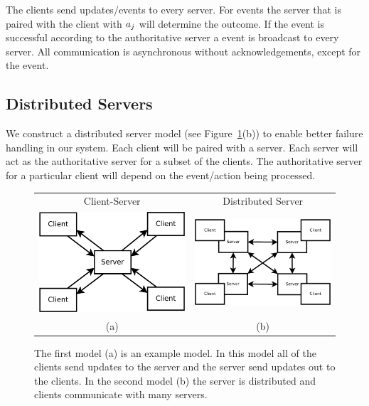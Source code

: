 	The clients send updates/events to every server. For  events the server that is paired with the client with $a_{j}$ will determine the outcome. If the  event is successful according to the authoritative server a  event is broadcast to every server. All communication is asynchronous without acknowledgements, except for the  event.


\subsection{Distributed Servers}
\label{subsec:distributed-servers}

	We construct a distributed server model (see Figure~\ref{figure:server-models}(b)) to enable better failure handling in our system. Each client will be paired with a server. Each server will act as the authoritative server for a subset of the clients. The authoritative server for a particular client will depend on the event/action being processed. 
	
	\begin{figure}[ht]
	\centering
	\begin{tabular}{c c}
		Client-Server & Distributed Server \\
		\includegraphics[width=0.44\linewidth]{../images/client-server-model-crop.pdf} &
		\includegraphics[width=0.48\linewidth]{../images/client-distributed-server-model-crop.pdf} \\
		(a) & (b)
	\end{tabular}

	\caption{\label{figure:server-models} The first model (a) is an example \clientServer model. In this model all of the clients send updates to the server and the server send updates out to the clients. In the second model (b) the server is distributed and clients communicate with many servers.}
	\end{figure}
	
